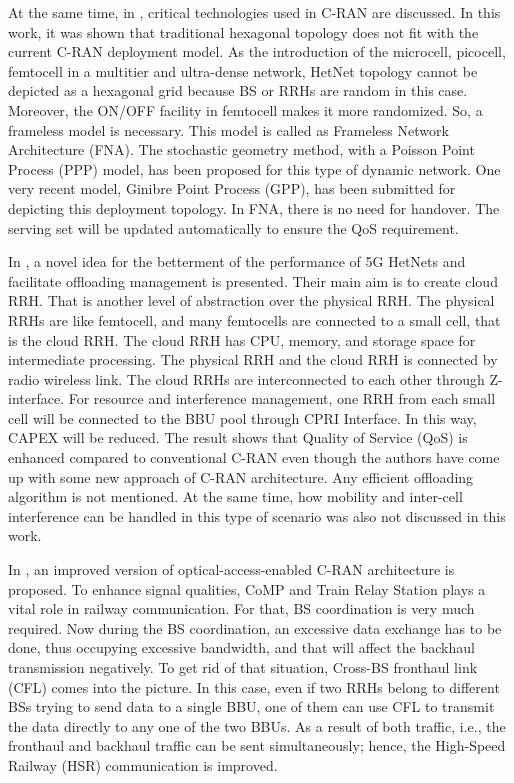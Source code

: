 \begin{multicols}{2}
At the same time, in \cite{art3-key25}, critical technologies used in C-RAN are discussed. In this work, it was shown that traditional hexagonal topology does not fit with the current C-RAN deployment model. As the introduction of the microcell, picocell, femtocell in a multitier and ultra-dense network, HetNet topology cannot be depicted as a hexagonal grid because BS or RRHs are random in this case. Moreover, the ON/OFF facility in femtocell makes it more randomized. So, a frameless model is necessary. This model is called as Frameless Network Architecture (FNA). The stochastic geometry method, with a Poisson Point Process (PPP) model, has been proposed for this type of dynamic network. One very recent model, Ginibre Point Process (GPP), has been submitted for depicting this deployment topology. In FNA, there is no need for handover. The serving set will be updated automatically to ensure the QoS requirement.

In \cite{art3-key26}, a novel idea for the betterment of the performance of 5G HetNets and facilitate offloading management is presented. Their main aim is to create cloud RRH. That is another level of abstraction over the physical RRH. The physical RRHs are like femtocell, and many femtocells are connected to a small cell, that is the cloud RRH. The cloud RRH has CPU, memory, and storage space for intermediate processing. The physical RRH and the cloud RRH is connected by radio wireless link. The cloud RRHs are interconnected to each other through Z-interface. For resource and interference management, one RRH from each small cell will be connected to the BBU pool through CPRI Interface. In this way, CAPEX will be reduced. The result shows that Quality of Service (QoS) is enhanced compared to conventional C-RAN even though the authors have come up with some new approach of C-RAN architecture. Any efficient offloading algorithm is not mentioned. At the same time, how mobility and inter-cell interference can be handled in this type of scenario was also not discussed in this work.

In \cite{art3-key27}, an improved version of optical-access-enabled C-RAN architecture is proposed. To enhance signal \hbox{qualities,} CoMP and Train Relay Station plays a vital role in railway communication. For that, BS coordination is very much required. Now during the BS coordination, an excessive data exchange has to be done, thus occupying excessive bandwidth, and that will affect the backhaul transmission negatively. To get rid of that situation, Cross-BS fronthaul link (CFL) comes into the picture. In this case, even if two RRHs belong to different BSs trying to send data to a single BBU, one of them can use CFL to transmit the data directly to any one of the two BBUs. As a result of both traffic, i.e., the fronthaul and backhaul traffic can be sent simultaneously; hence, the High-Speed Railway (HSR) communication is improved.


\end{multicols}
